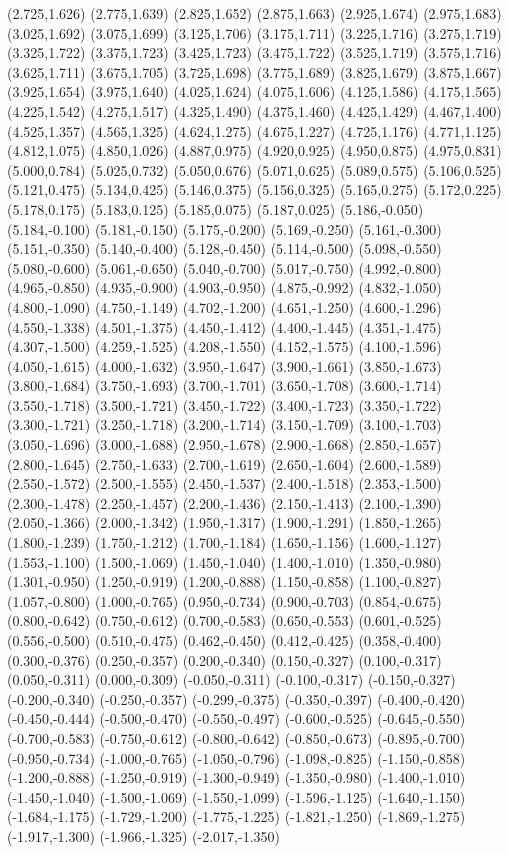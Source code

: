 (2.725,1.626) (2.775,1.639) (2.825,1.652) (2.875,1.663) (2.925,1.674) (2.975,1.683) (3.025,1.692) (3.075,1.699) (3.125,1.706) (3.175,1.711) (3.225,1.716) (3.275,1.719) (3.325,1.722) (3.375,1.723) (3.425,1.723) (3.475,1.722) (3.525,1.719) (3.575,1.716) (3.625,1.711) (3.675,1.705) (3.725,1.698) (3.775,1.689) (3.825,1.679) (3.875,1.667) (3.925,1.654) (3.975,1.640) (4.025,1.624) (4.075,1.606) (4.125,1.586) (4.175,1.565) (4.225,1.542) (4.275,1.517) (4.325,1.490) (4.375,1.460) (4.425,1.429) (4.467,1.400) (4.525,1.357) (4.565,1.325) (4.624,1.275) (4.675,1.227) (4.725,1.176) (4.771,1.125) (4.812,1.075) (4.850,1.026) (4.887,0.975) (4.920,0.925) (4.950,0.875) (4.975,0.831) (5.000,0.784) (5.025,0.732) (5.050,0.676) (5.071,0.625) (5.089,0.575) (5.106,0.525) (5.121,0.475) (5.134,0.425) (5.146,0.375) (5.156,0.325) (5.165,0.275) (5.172,0.225) (5.178,0.175) (5.183,0.125) (5.185,0.075) (5.187,0.025) (5.186,-0.050) (5.184,-0.100) (5.181,-0.150) (5.175,-0.200) (5.169,-0.250) (5.161,-0.300) (5.151,-0.350) (5.140,-0.400) (5.128,-0.450) (5.114,-0.500) (5.098,-0.550) (5.080,-0.600) (5.061,-0.650) (5.040,-0.700) (5.017,-0.750) (4.992,-0.800) (4.965,-0.850) (4.935,-0.900) (4.903,-0.950) (4.875,-0.992) (4.832,-1.050) (4.800,-1.090) (4.750,-1.149) (4.702,-1.200) (4.651,-1.250) (4.600,-1.296) (4.550,-1.338) (4.501,-1.375) (4.450,-1.412) (4.400,-1.445) (4.351,-1.475) (4.307,-1.500) (4.259,-1.525) (4.208,-1.550) (4.152,-1.575) (4.100,-1.596) (4.050,-1.615) (4.000,-1.632) (3.950,-1.647) (3.900,-1.661) (3.850,-1.673) (3.800,-1.684) (3.750,-1.693) (3.700,-1.701) (3.650,-1.708) (3.600,-1.714) (3.550,-1.718) (3.500,-1.721) (3.450,-1.722) (3.400,-1.723) (3.350,-1.722) (3.300,-1.721) (3.250,-1.718) (3.200,-1.714) (3.150,-1.709) (3.100,-1.703) (3.050,-1.696) (3.000,-1.688) (2.950,-1.678) (2.900,-1.668) (2.850,-1.657) (2.800,-1.645) (2.750,-1.633) (2.700,-1.619) (2.650,-1.604) (2.600,-1.589) (2.550,-1.572) (2.500,-1.555) (2.450,-1.537) (2.400,-1.518) (2.353,-1.500) (2.300,-1.478) (2.250,-1.457) (2.200,-1.436) (2.150,-1.413) (2.100,-1.390) (2.050,-1.366) (2.000,-1.342) (1.950,-1.317) (1.900,-1.291) (1.850,-1.265) (1.800,-1.239) (1.750,-1.212) (1.700,-1.184) (1.650,-1.156) (1.600,-1.127) (1.553,-1.100) (1.500,-1.069) (1.450,-1.040) (1.400,-1.010) (1.350,-0.980) (1.301,-0.950) (1.250,-0.919) (1.200,-0.888) (1.150,-0.858) (1.100,-0.827) (1.057,-0.800) (1.000,-0.765) (0.950,-0.734) (0.900,-0.703) (0.854,-0.675) (0.800,-0.642) (0.750,-0.612) (0.700,-0.583) (0.650,-0.553) (0.601,-0.525) (0.556,-0.500) (0.510,-0.475) (0.462,-0.450) (0.412,-0.425) (0.358,-0.400) (0.300,-0.376) (0.250,-0.357) (0.200,-0.340) (0.150,-0.327) (0.100,-0.317) (0.050,-0.311) (0.000,-0.309) (-0.050,-0.311) (-0.100,-0.317) (-0.150,-0.327) (-0.200,-0.340) (-0.250,-0.357) (-0.299,-0.375) (-0.350,-0.397) (-0.400,-0.420) (-0.450,-0.444) (-0.500,-0.470) (-0.550,-0.497) (-0.600,-0.525) (-0.645,-0.550) (-0.700,-0.583) (-0.750,-0.612) (-0.800,-0.642) (-0.850,-0.673) (-0.895,-0.700) (-0.950,-0.734) (-1.000,-0.765) (-1.050,-0.796) (-1.098,-0.825) (-1.150,-0.858) (-1.200,-0.888) (-1.250,-0.919) (-1.300,-0.949) (-1.350,-0.980) (-1.400,-1.010) (-1.450,-1.040) (-1.500,-1.069) (-1.550,-1.099) (-1.596,-1.125) (-1.640,-1.150) (-1.684,-1.175) (-1.729,-1.200) (-1.775,-1.225) (-1.821,-1.250) (-1.869,-1.275) (-1.917,-1.300) (-1.966,-1.325) (-2.017,-1.350) 